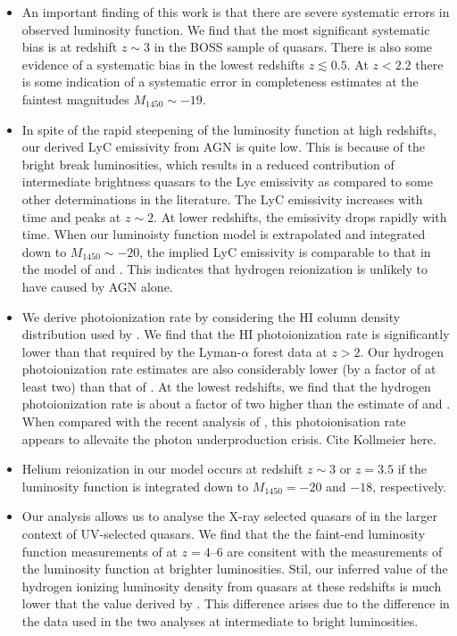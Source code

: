 \documentclass[a4paper,fleqn,usenatbib]{mnras}
\begin{document}
\begin{itemize}
\item An important finding of this work is that there are severe
  systematic errors in observed luminosity function.  We find that the
  most significant systematic bias is at redshift $z\sim 3$ in the
  BOSS sample of quasars.  There is also some evidence of a systematic
  bias in the lowest redshifts $z\lesssim 0.5$.  At $z<2.2$ there is
  some indication of a systematic error in completeness estimates at
  the faintest magnitudes $M_{1450}\sim -19$.  

\item In spite of the rapid steepening of the luminosity function at
  high redshifts, our derived LyC emissivity from AGN is quite low.
  This is because of the bright break luminosities, which results in a
  reduced contribution of intermediate brightness quasars to the Lyc
  emissivity as compared to some other determinations in the
  literature.  The LyC emissivity increases with time and peaks at
  $z\sim 2$.  At lower redshifts, the emissivity drops rapidly with
  time.  When our luminoisty function model is extrapolated and
  integrated down to $M_{1450}\sim -20$, the implied LyC emissivity is
  comparable to that in the model of \citet{2007ApJ...654..731H} and
  \citet{2012ApJ...746..125H}.  This indicates that hydrogen
  reionization is unlikely to have caused by AGN alone.

\item We derive photoionization rate by considering the HI column
  density distribution used by \citep{2012ApJ...746..125H}.  We find
  that the HI photoionization rate is significantly lower than that
  required by the Lyman-$\alpha$ forest data at $z>2$.  Our hydrogen
  photoionization rate estimates are also considerably lower (by a
  factor of at least two) than that of \citet{2015AA...578A..83G}.  At
  the lowest redshifts, we find that the hydrogen photoionization rate
  is about a factor of two higher than the estimate of
  \citet{2007ApJ...654..731H} and \citet{2012ApJ...746..125H}.  When
  compared with the recent analysis of \citet{2017MNRAS.467.3172G},
  this photoionisation rate appears to allevaite the photon
  underproduction crisis.  Cite Kollmeier here.  
  
\item Helium reionization in our model occurs at redshift $z\sim
  3$ or $z=3.5$ if the luminosity function is integrated down to
  $M_{1450}=-20$ and $-18$, respectively.
  
\item Our analysis allows us to analyse the X-ray selected quasars of
  \citet{2015AA...578A..83G} in the larger context of UV-selected
  quasars.  We find that the the faint-end luminosity function
  measurements of \citet{2015AA...578A..83G} at $z=4$--$6$ are
  consitent with the measurements of the luminosity function at
  brighter luminosities.  Stil, our inferred value of the hydrogen
  ionizing luminosity density from quasars at these redshifts is much
  lower that the value derived by \citet{2015AA...578A..83G}.  This
  difference arises due to the difference in the data used in the two
  analyses at intermediate to bright luminosities.  
\end{itemize}
\end{document}
